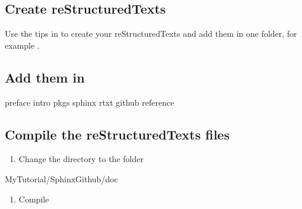 \documentclass[letterpaper,11pt,english]{sphinxmanual}
\begin{document}
\subsection{Create reStructuredTexts}
\label{\detokenize{github:id1}}
Use the tips in {\hyperref[\detokenize{rtxt:rtext}]{}} to create your reStructuredTexts and add them in one folder, for example .

\begin{figure}[htbp]
\centering

\noindent{}
\end{figure}


\subsection{Add them in }
\label{\detokenize{github:add-them-in-index-rst}}
\begin{sphinxVerbatim}[commandchars=\\\{\}]

 
    

   preface
   intro
   pkgs
   sphinx
   rtxt
   github
   reference
\end{sphinxVerbatim}


\subsection{Compile the reStructuredTexts files}
\label{\detokenize{github:compile-the-rests-files}}\begin{enumerate}
\def\theenumi{\arabic{enumi}}
\def\labelenumi{\theenumi .}
\makeatletter\def\p@enumii{\p@enumi \theenumi .}\makeatother
\item {} 
Change the directory to the folder

\end{enumerate}

\begin{sphinxVerbatim}[commandchars=\\\{\}]
 MyTutorial/SphinxGithub/doc
\end{sphinxVerbatim}
\begin{enumerate}
\def\theenumi{\arabic{enumi}}
\def\labelenumi{\theenumi .}
\makeatletter\def\p@enumii{\p@enumi \theenumi .}\makeatother
\setcounter{enumi}{1}
\item {} 
Compile

\end{enumerate}
\end{document}
